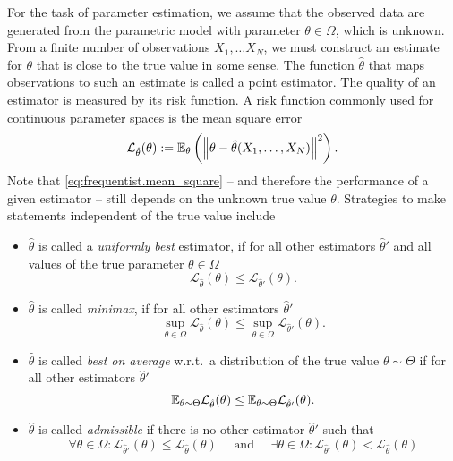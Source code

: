 For the task of parameter estimation, we assume that the observed data are generated from the parametric model with  parameter $\theta \in \Omega$, which is unknown.
From a finite number of observations $X_1, \ldots X_N$, we must construct an estimate for $\theta$ that is close to the true value in some sense.
The function $\hat\theta$ that maps observations to such an estimate is called a point estimator.
The quality of an estimator is measured by its risk function.
A risk function commonly used for continuous parameter spaces is the mean square error
\[
  \label{eq:frequentist.mean_square}
  \mathcal{L}_{\hat\theta}(\theta) := \mathbb{E}_\theta \left( {\left\Vert\theta - \hat\theta(X_1, \ldots, X_N)\right\Vert}^2 \right).
\]
Note that \cref{eq:frequentist.mean_square} -- and therefore the performance of a given estimator -- still depends on the unknown true value $\theta$.
Strategies to make statements independent of the true value include 
\begin{definition}
  \label{def:frequentist.optimality_conditions}
  \begin{itemize}
    \item $\hat\theta$ is called a \emph{uniformly best} estimator, if for all other estimators $\hat\theta'$ and all values of the true parameter $\theta \in \Omega$
    \[
      \mathcal{L}_{\hat\theta}(\theta) \le \mathcal{L}_{\hat\theta'}(\theta).
    \]

    \item $\hat\theta$ is called \emph{minimax}, if for all other estimators $\hat\theta'$
    \[
      \sup_{\theta\in\Omega} \mathcal{L}_{\hat\theta}(\theta) \le \sup_{\theta\in\Omega} \mathcal{L}_{\hat\theta'}(\theta).
    \]

    \item $\hat\theta$ is called \emph{best on average} w.r.t.\ a distribution of the true value $\theta \sim \Theta$ if for all other estimators $\hat\theta'$
    \[
      \mathbb{E}_{\theta \sim \Theta} \mathcal{L}_{\hat\theta}(\theta) \le  \mathbb{E}_{\theta \sim \Theta} \mathcal{L}_{\hat\theta'}(\theta).
    \]

    \item $\hat\theta$ is called \emph{admissible} if there is no other estimator $\hat\theta'$ such that
    \[
      \forall\theta \in \Omega\colon \mathcal{L}_{\hat\theta'}(\theta) \le \mathcal{L}_{\hat\theta}(\theta) 
      \quad\mbox{ and }\quad
      \exists\theta \in \Omega\colon \mathcal{L}_{\hat\theta'}(\theta) < \mathcal{L}_{\hat\theta}(\theta) 
    \]
  \end{itemize}
\end{definition}


